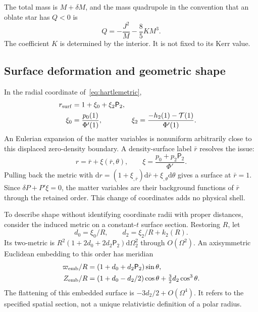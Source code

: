 \documentclass[journal,a4paper]{IEEEtran}
\newcommand{\dd}{\mathrm d}
\begin{document}
The total mass is $M+\delta M$, and the mass quadrupole in the convention that an oblate star has $Q<0$ is
\begin{equation}
 Q=-\frac{J^2}{M}-\frac85KM^3.
 \label{eq:quadrupole}
\end{equation}
The coefficient $K$ is determined by the interior. It is not fixed to its Kerr value.

\subsection{Surface deformation and geometric shape}
In the radial coordinate of~\eqref{eq:hartlemetric},
\begin{align}
 r_{\rm surf}&=1+\xi_0+\xi_2\mathsf P_2,\nonumber\\
 \xi_0&=\frac{p_0(1)}{\Phi'(1)},&
 \xi_2&=\frac{-h_2(1)-\mathcal T(1)}{\Phi'(1)}.
 \label{eq:surface}
\end{align}
An Eulerian expansion of the matter variables is nonuniform arbitrarily close to this displaced zero-density boundary. A density-surface label $\bar r$ resolves the issue:
\begin{equation}
 r=\bar r+\xi(\bar r,\theta),\qquad
 \xi=\frac{p_0+p_2\mathsf P_2}{\Phi'}.
 \label{eq:lagrange}
\end{equation}
Pulling back the metric with
$\dd r=(1+\xi_{,\bar r})\dd\bar r+\xi_{,\theta}\dd\theta$
gives a surface at $\bar r=1$. Since $\delta P+P'\xi=0$, the matter variables are their background functions of $\bar r$ through the retained order. This change of coordinates adds no physical shell.

To describe shape without identifying coordinate radii with proper distances, consider the induced metric on a constant-$t$ surface section. Restoring $R$, let
\begin{equation}
 d_0=\xi_0/R,\qquad d_2=\xi_2/R+k_2(R).
\end{equation}
Its two-metric is $R^2(1+2d_0+2d_2\mathsf P_2)\dd\Omega_2^2$ through $O(\Omega^2)$. An axisymmetric Euclidean embedding to this order has meridian
\begin{align}
 \varpi_{\rm emb}/R&=(1+d_0+d_2\mathsf P_2)\sin\theta,\nonumber\\
 Z_{\rm emb}/R&=(1+d_0-d_2/2)\cos\theta
                  +\tfrac32d_2\cos^3\theta.\label{eq:embedding}
\end{align}
The flattening of this embedded surface is $-3d_2/2+O(\Omega^4)$. It refers to the specified spatial section, not a unique relativistic definition of a polar radius.
\end{document}
